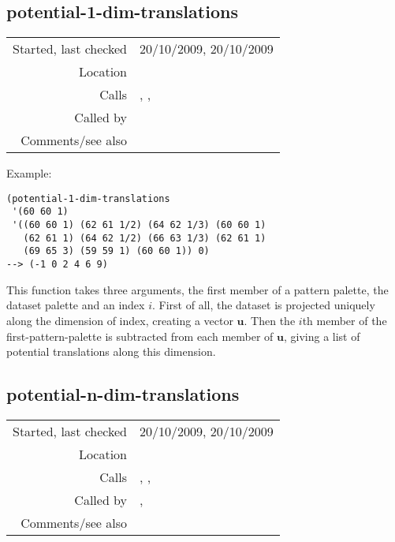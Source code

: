 \subsection*{potential-1-dim-translations}\label{fun:potential-1-dim-translations}

\vspace{0.3cm}
\begin{tabular}{r|p{8cm}}
Started, last checked & 20/10/2009, 20/10/2009 \\
Location & \nameref{sec:empirical-preliminaries} \\
Calls & \nameref{fun:constant-vector}, \nameref{fun:nth-list-of-lists},\newline \nameref{fun:orthogonal-projection-unique-equalp} \\
Called by & \nameref{fun:potential-n-dim-translations} \\
Comments/see also &
\end{tabular}

\vspace{0.5cm}
\noindent Example:
\begin{verbatim}
(potential-1-dim-translations
 '(60 60 1)
 '((60 60 1) (62 61 1/2) (64 62 1/3) (60 60 1)
   (62 61 1) (64 62 1/2) (66 63 1/3) (62 61 1)
   (69 65 3) (59 59 1) (60 60 1)) 0)
--> (-1 0 2 4 6 9)
\end{verbatim}

\noindent This function takes three arguments, the
first member of a pattern palette, the dataset palette
and an index $i$. First of all, the dataset is
projected uniquely along the dimension of index,
creating a vector $\mathbf{u}$. Then the $i$th member
of the first-pattern-palette is subtracted from each
member of $\mathbf{u}$, giving a list of potential
translations along this dimension.


\subsection*{potential-n-dim-translations}\label{fun:potential-n-dim-translations}

\vspace{0.3cm}
\begin{tabular}{r|p{8cm}}
Started, last checked & 20/10/2009, 20/10/2009 \\
Location & \nameref{sec:empirical-preliminaries} \\
Calls & \nameref{fun:add-to-list}, \nameref{fun:first-n-naturals},\newline \nameref{fun:potential-1-dim-translations} \\
Called by & \nameref{fun:likelihood-of-pattern-or-translation}, \nameref{fun:likelihood-of-translations-geometric-mean} \\
Comments/see also &
\end{tabular}

